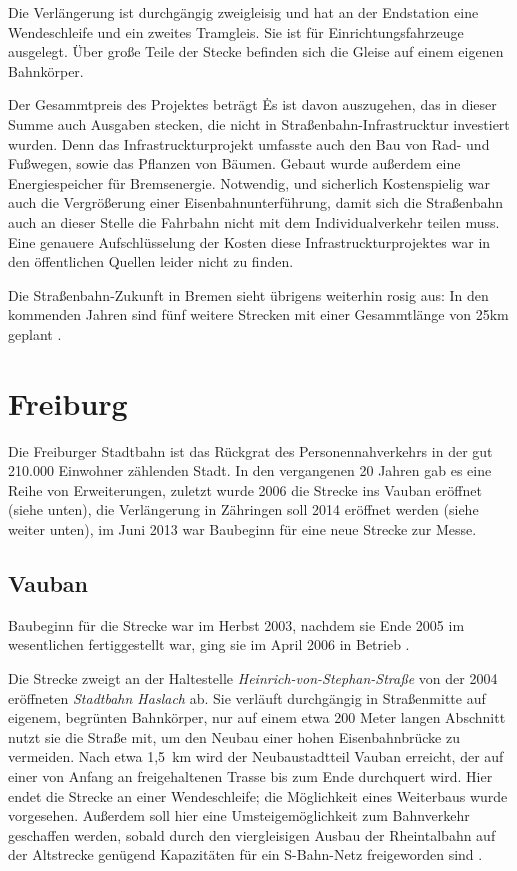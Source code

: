Die Verlängerung ist durchgängig zweigleisig und hat an der Endstation eine Wendeschleife und ein zweites Tramgleis. Sie ist für Einrichtungsfahrzeuge ausgelegt. Über große Teile der Stecke befinden sich die Gleise auf einem eigenen Bahnkörper\cite{bBub11}. 

Der Gesammtpreis des Projektes beträgt \. Es ist davon auszugehen, das in dieser Summe auch Ausgaben stecken, die nicht in Straßenbahn-Infrastrucktur investiert wurden. Denn das Infrastruckturprojekt umfasste auch den Bau von Rad- und Fußwegen, sowie das Pflanzen von Bäumen\cite{bNp10}. Gebaut wurde außerdem eine Energiespeicher für Bremsenergie\cite{bSv12}. Notwendig, und sicherlich Kostenspielig war auch die Vergrößerung einer Eisenbahnunterführung, damit sich die Straßenbahn auch an dieser Stelle die Fahrbahn nicht mit dem Individualverkehr teilen muss. Eine genauere Aufschlüsselung der Kosten diese Infrastruckturprojektes war in den öffentlichen Quellen leider nicht zu finden. 

Die Straßenbahn-Zukunft in Bremen sieht übrigens weiterhin rosig aus:
In den kommenden Jahren sind fünf weitere Strecken mit einer Gesammtlänge von 25km geplant \cite{bNp10}.


\section{Freiburg}

Die Freiburger Stadtbahn ist das Rückgrat des Personennahverkehrs in der gut 210.000 Einwohner zählenden Stadt. In den vergangenen 20 Jahren gab es eine Reihe von Erweiterungen, zuletzt wurde 2006 die Strecke ins Vauban eröffnet (siehe unten), die Verlängerung in Zähringen soll 2014 eröffnet werden (siehe weiter unten), im Juni 2013 war Baubeginn für eine neue Strecke zur Messe.

\subsection*{Vauban}

Baubeginn für die Strecke war im Herbst 2003, nachdem sie Ende 2005 im wesentlichen fertiggestellt war, ging sie im April 2006 in Betrieb \cite{FRabv}.

Die Strecke zweigt an der Haltestelle \textit{Heinrich-von-Stephan-Straße} von der 2004 eröffneten \textit{Stadtbahn Haslach} ab.
Sie verläuft durchgängig in Straßenmitte auf eigenem, begrünten Bahnkörper, nur auf einem etwa 200 Meter langen Abschnitt nutzt sie die Straße mit, um den Neubau einer hohen Eisenbahnbrücke zu vermeiden.
Nach etwa 1,5{\ }km wird der Neubaustadtteil Vauban erreicht, der auf einer von Anfang an freigehaltenen Trasse bis zum Ende durchquert wird.
Hier endet die Strecke an einer Wendeschleife; die Möglichkeit eines Weiterbaus wurde vorgesehen.
Außerdem soll hier eine Umsteigemöglichkeit zum Bahnverkehr geschaffen werden, sobald durch den viergleisigen Ausbau der Rheintalbahn auf der Altstrecke genügend Kapazitäten für ein S-Bahn-Netz freigeworden sind \cite{FRabv} \cite{beob}.

